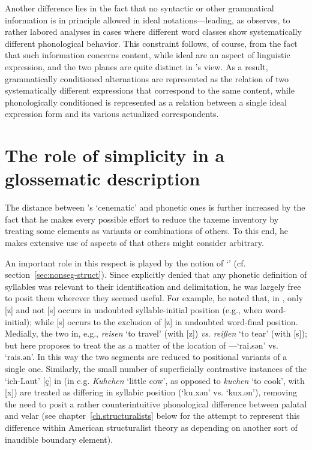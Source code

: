 Another difference lies in the fact that no syntactic or other
grammatical information is in principle allowed in ideal
notations—leading, as
\citet{basboll71:hjelmslev1,basboll72:hjelmslev2} observes, to rather labored
analyses in cases where different word classes show systematically
different phonological behavior. This constraint follows, of course,
from the fact that such information concerns content, while ideal
 are an aspect of linguistic expression, and the two
planes are quite distinct in {\Hjelmslev}'s view. As a result,
grammatically conditioned alternations are represented as the relation
of two systematically different expressions that correspond to the
same content, while phonologically conditioned  is
represented as a relation between a single ideal expression form and
its various actualized correspondents.

\section{The role of simplicity in a glossematic description}

The distance between {\Hjelmslev}'s `cenematic'  and
phonetic ones is further increased by the fact that he makes every
possible effort to reduce the taxeme inventory by treating some
elements as variants or combinations of others. To this end, he makes
extensive use of aspects of  that others might consider
arbitrary.

An important role in this respect is played by the notion of
`' (cf.  section~\ref{sec:nonseg-struct}). Since {\Hjelmslev}
explicitly denied that any phonetic definition of syllables was
relevant to their identification and delimitation, he was largely free
to posit them wherever they seemed useful. For example, he noted that,
in , only {[z]} and not {[s]} occurs in undoubted
syllable-initial position (e.g., when word-initial); while {[s]}
occurs to the exclusion of {[z]} in undoubted word-final
position. Medially, the two  in, e.g., \emph{reisen} `to
travel' (with {[z]}) \emph{vs}. \emph{reißen} `to tear' (with {[s]});
but here {\Hjelmslev} proposes to treat the  as a matter of the
location of  —`rai.sən' vs. `rais.ən'. In this way
the two segments are reduced to positional variants of a single
one. Similarly, the small number of superficially contrastive
instances of the `ich-Laut' [ç] in  (in e.g. \emph{Kuhchen}
`little cow', as opposed to \emph{kuchen} `to cook', with {[x]}) are
treated as differing in syllabic position (`ku.xən' vs. `kux.ən'),
removing the need to posit a rather counterintuitive phonological
difference between palatal and velar  (see
chapter~\ref{ch.structuralists} below for the attempt to represent
this difference within American structuralist theory as depending on
another sort of inaudible boundary element).

